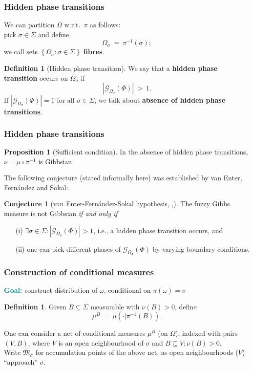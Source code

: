 \documentclass{beamer}
\newcommand{\G}{\mathcal{G}}
\newcommand{\MM}{\overline{\mathfrak{M}}}
\newcommand{\set}[1]{\left\{#1\right\}}
\newcommand{\pika}{\boldsymbol{\cdot}}
\newcommand{\1}{\mathbbm{1}}
\newcommand{\5}{\vspace{0.5cm}}
\newcommand{\3}{\vspace{0.3cm}}
\theoremstyle{definition}
\newtheorem{prop}[thm]{Proposition}
\newtheorem{df}[thm]{Definition}
\newtheorem*{conj}{Conjecture}
\begin{document}

\begin{frame}
\frametitle{Hidden phase transitions}
We can partition $\Omega$ w.r.t.~$\pi$ as follows:\\\vspace{0.3cm}\pause
pick $\sigma\in\Sigma$ and define
$$\Omega_\sigma ~=~ \pi^{-1}(\sigma);$$
we call sets $\set{\Omega_\sigma:\sigma\in\Sigma}$ \textbf{fibres}.\pause
\begin{df}[Hidden phase transition]
We say that a \textbf{hidden phase transition} occurs on $\Omega_\sigma$ if
$$|\G_{\Omega_\sigma}(\Phi)| ~>~ 1.$$\pause
If $|\G_{\Omega_\sigma}(\Phi)|=1$ for all $\sigma\in\Sigma$, we talk about \textbf{absence of hidden phase transitions}.

\end{df}
\end{frame}

\begin{frame}
\frametitle{Hidden phase transitions}
\begin{prop}[Sufficient condition]
In the absence of hidden phase transitions, $\nu=\mu\circ\pi^{-1}$ is Gibbsian.
\end{prop}\vspace{0.3cm}\pause
The following conjecture (stated informally here) was established by van Enter, Fern\'andez and Sokal:\pause
\begin{conj}[van Enter-Fern\'andez-Sokal hypothesis, \cite{EFS},\cite{Ber}]
The fuzzy Gibbs measure is not Gibbsian \textit{if and only if}\pause
\begin{itemize}
	\item[(i)] $\exists\sigma\in\Sigma:|\G_{\Omega_\sigma}(\Phi)|>1$, i.e., a hidden phase transition occurs, and\pause
	\item[(ii)] one can pick different phases of $\G_{\Omega_\sigma}(\Phi)$ by varying boundary conditions.
\end{itemize}
\end{conj}
\end{frame}


\begin{frame}
\frametitle{Construction of conditional measures}
\textcolor{teal}{\textbf{Goal:}} construct distribution of $\omega$, conditional on $\pi(\omega)=\sigma$\pause
\begin{df}
Given $B\subseteq\Sigma$ measurable with $\nu(B)>0$, define
$$\mu^B ~=~ \mu(\pika|\pi^{-1}(B)).$$
\end{df}\pause
One can consider a net of conditional measures $\mu^B$ (on $\Omega$), indexed with pairs $(V,B)$, where $V$ is an open neighbourhood of $\sigma$ and $B\subseteq V:\nu(B)>0$. \\\vspace{0.5cm}\pause
Write $\MM_\sigma$ for accumulation points of the above net, as open neighbourhoods ($V$) ``approach'' $\sigma$.
\end{frame}
\end{document}
